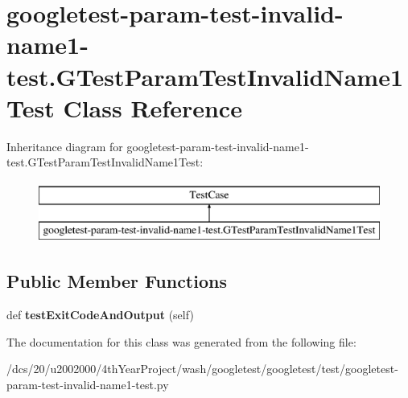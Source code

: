 \hypertarget{classgoogletest-param-test-invalid-name1-test_1_1GTestParamTestInvalidName1Test}{}\section{googletest-\/param-\/test-\/invalid-\/name1-\/test.G\+Test\+Param\+Test\+Invalid\+Name1\+Test Class Reference}
\label{classgoogletest-param-test-invalid-name1-test_1_1GTestParamTestInvalidName1Test}
Inheritance diagram for googletest-\/param-\/test-\/invalid-\/name1-\/test.G\+Test\+Param\+Test\+Invalid\+Name1\+Test\+:\begin{figure}[H]
\begin{center}
\leavevmode
\includegraphics[height=2.000000cm]{classgoogletest-param-test-invalid-name1-test_1_1GTestParamTestInvalidName1Test}
\end{center}
\end{figure}
\subsection*{Public Member Functions}
\begin{DoxyCompactItemize}
\item 
\mbox{\label{classgoogletest-param-test-invalid-name1-test_1_1GTestParamTestInvalidName1Test_a2b7024a50e0b3b0fe9b0c6d28e470681}} 
def {\bfseries test\+Exit\+Code\+And\+Output} (self)
\end{DoxyCompactItemize}


The documentation for this class was generated from the following file\+:\begin{DoxyCompactItemize}
\item 
/dcs/20/u2002000/4th\+Year\+Project/wash/googletest/googletest/test/googletest-\/param-\/test-\/invalid-\/name1-\/test.\+py\end{DoxyCompactItemize}
